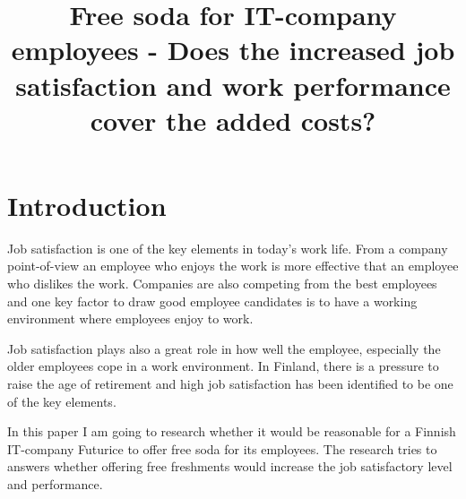 \documentclass[a4paper]{article}
\begin{document}
\usepackage[top=0pt, bottom=0pt, left=70pt, right=70pt]{geometry}

\title{\huge Free soda for IT-company employees - Does the increased job satisfaction and work performance cover the added costs?}
\date{\vspace{-5ex}}
\maketitle

\large

\begin{comment}
\title{\huge Free soda for IT-company employees}
\date{2.1.2013}
\author{Mikko Koski \\ mikko.koski@aalto.fi}
\maketitle
\end{comment}

\large

\section{Introduction}

\begin{comment}
Why is this research important? 
Is there a bigger phenomenon that this research of yours is part of? 
Why people in your profession should care about this thesis?
\end{comment}

Job satisfaction is one of the key elements in today's work life. From a company point-of-view an employee who enjoys the work is more effective that an employee who dislikes the work. Companies are also competing from the best employees and one key factor to draw good employee candidates is to have a working environment where employees enjoy to work.

Job satisfaction plays also a great role in how well the employee, especially the older employees cope in a work environment. In Finland, there is a pressure to raise the age of retirement and high job satisfaction has been identified to be one of the key elements.

In this paper I am going to research whether it would be reasonable for a Finnish IT-company Futurice to offer free soda for its employees. The research tries to answers whether offering free freshments would increase the job satisfactory level and performance. 
\end{document}
